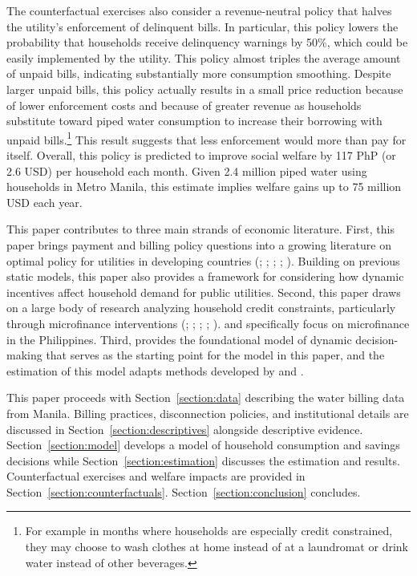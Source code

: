 \documentclass[12pt,table]{article}
\begin{document}
The counterfactual exercises also consider a revenue-neutral policy that halves the utility's enforcement of delinquent bills.  In particular, this policy lowers the probability that households receive delinquency warnings by 50\%, which could be easily implemented by the utility.  This policy almost triples the average amount of unpaid bills, indicating substantially more consumption smoothing.  Despite larger unpaid bills, this policy actually results in a small price reduction because of lower enforcement costs and because of greater revenue as households substitute toward piped water consumption to increase their borrowing with unpaid bills.\footnote{For example in months where households are especially credit constrained, they may choose to wash clothes at home instead of at a laundromat or drink water instead of other beverages.}  This result suggests that less enforcement would more than pay for itself.  Overall, this policy is predicted to improve social welfare by 117 PhP (or 2.6 USD) per household each month.  Given 2.4 million piped water using households in Metro Manila, this estimate implies welfare gains up to 75 million USD each year.

This paper contributes to three main strands of economic literature.  First, this paper brings payment and billing policy questions into a growing literature on optimal policy for utilities in developing countries (\cite{mcrae2015infrastructure}; \cite{szabo2015value}; \cite{jack2016charging}; \cite{jack2015pay}; \cite{szabo2015reducing}).  Building on previous static models, this paper also provides a framework for considering how dynamic incentives affect household demand for public utilities.  Second, this paper draws on a large body of research analyzing household credit constraints, particularly through microfinance interventions (\cite{morduch1999microfinance}; \cite{morduch1995income}; \cite{cull2009microfinance}; \cite{dupas2013savings}; \cite{jack2016borrowing}).  \cite{karlan2009expanding} and \cite{gine2014group} specifically focus on microfinance in the Philippines. Third, \cite{deaton1991saving} provides the foundational model of dynamic decision-making that serves as the starting point for the model in this paper, and the estimation of this model adapts methods developed by \cite{gourinchas2002consumption} and \cite{laibson2007estimating}.

This paper proceeds with Section~\ref{section:data} describing the water billing data from Manila.  Billing practices, disconnection policies, and institutional details are discussed in Section~\ref{section:descriptives} alongside descriptive evidence.  Section~\ref{section:model} develops a model of household consumption and savings decisions while Section~\ref{section:estimation} discusses the estimation and results.  Counterfactual exercises and welfare impacts are provided in Section~\ref{section:counterfactuals}.  Section~\ref{section:conclusion} concludes. 
\end{document}
